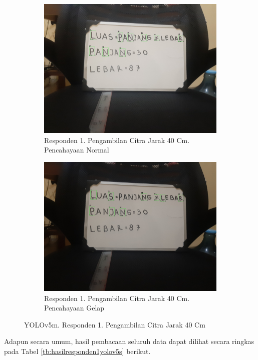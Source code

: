 \begin{figure}[H]
  \begin{subfigure}{.5\textwidth}
    \centering
    \captionsetup{width=.8\linewidth}
    \includegraphics[width=.8\linewidth]{gambar/yolov5m/responden1/dinda40cm00-result.jpg}
    \caption{Responden 1. Pengambilan Citra Jarak 40 Cm. Pencahayaan Normal}
    \label{fig:mr1tcitra40cm}
  \end{subfigure}%
  \begin{subfigure}{.5\textwidth}
    \centering
    \captionsetup{width=.8\linewidth}
    \includegraphics[width=.8\linewidth]{gambar/yolov5m/responden1/dinda40cm10-result.jpg}
    \caption{Responden 1. Pengambilan Citra Jarak 40 Cm. Pencahayaan Gelap}
    \label{fig:mr1gcitra40cm}
  \end{subfigure}
  \caption{YOLOv5m. Responden 1. Pengambilan Citra Jarak 40 Cm}
  \label{fig:mr1citra40cm}
\end{figure}

Adapun secara umum, hasil pembacaan seluruh data dapat dilihat secara ringkas pada Tabel \ref*{tb:hasilresponden1yolov5s} berikut.

